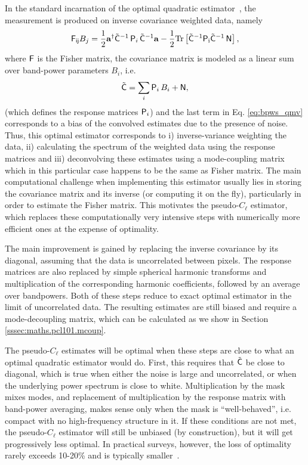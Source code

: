 \documentclass[usenatbib]{mnrasb}
\newcommand{\va}{{\mathbf{a}}}
\begin{document}
        In the standard incarnation of the optimal quadratic estimator~\citep{1998PhRvD..57.2117B}, the measurement is produced on inverse covariance weighted data, namely
        \begin{equation}
          {\sf F_{ij}} B_j = \frac{1}{2}\va^\dagger \tilde{\sf C}^{-1}\,{\sf P}_i\,\tilde{\sf C}^{-1} \va -
          \frac{1}{2}\rm{Tr}\left[\tilde{\sf C}^{-1}{\sf P}_i\tilde{\sf C}^{-1}\,{\sf N} \right],
        \end{equation}
        where ${\sf F}$ is the Fisher matrix, the covariance matrix is modeled as a linear sum over band-power parameters $B_i$, i.e.
        \begin{equation}\label{eq:bpws_qmv}
          \tilde{\sf C} = \sum_i {\sf P}_i\,B_i + {\sf N},
        \end{equation}
        (which defines the response matrices ${\sf P}_i$) and the last term in Eq. \ref{eq:bpws_qmv} corresponds to a bias of the convolved estimates due to the presence of noise. Thus, this optimal estimator corresponds to i) inverse-variance weighting the data, ii) calculating the spectrum of the weighted data using the response matrices and iii) deconvolving these estimates using a mode-coupling matrix which in this particular case happens to be the same as Fisher matrix. The main computational challenge when implementing this estimator usually lies in storing the covariance matrix and its inverse (or computing it on the fly), particularly in order to estimate the Fisher matrix. This motivates the pseudo-$C_\ell$ estimator, which replaces these computationally very intensive steps with numerically more efficient ones at the expense of optimality.

        The main improvement is gained by replacing the inverse covariance by its diagonal, assuming that the data is uncorrelated between pixels. The response matrices are also replaced by simple spherical harmonic transforms and multiplication of the corresponding harmonic coefficients, followed by an average over bandpowers. Both of these steps reduce to exact optimal estimator in the limit of uncorrelated data. The resulting estimates are still biased and require a mode-decoupling matrix, which can be calculated as we show in Section \ref{sssec:maths.pcl101.mcoup}. 

        The pseudo-$C_\ell$ estimates will be optimal when these steps are close to what an optimal quadratic estimator would do. First, this requires that $\tilde{\sf C}$ be close to diagonal, which is true when either the noise is large and uncorrelated, or when the underlying power spectrum is close to white. Multiplication by the mask mixes modes, and replacement of multiplication by the response matrix with band-power averaging, makes sense only when the mask is ``well-behaved'', i.e. compact with no high-frequency structure in it. If these conditions are not met, the pseudo-$C_\ell$ estimator will still be unbiased (by construction), but it will get progressively less optimal. In practical surveys, however, the loss of optimality rarely exceeds 10-20\% and is typically smaller~\citep{2013MNRAS.435.1857L}.
\end{document}
